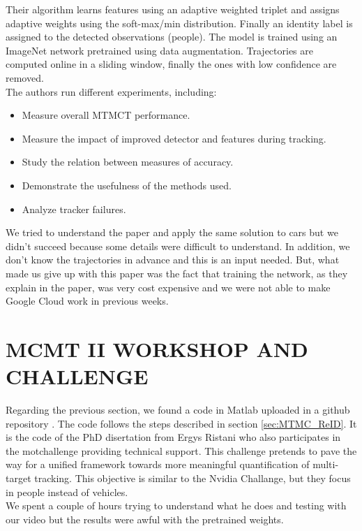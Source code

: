 \documentclass[journal, a4paper]{IEEEtran}
\begin{document}
Their algorithm  learns features using an adaptive weighted triplet and 
assigns adaptive weights using the soft-max/min distribution. Finally an identity label is assigned to the detected observations (people).
The model is trained using an ImageNet network pretrained using data augmentation. Trajectories are computed online in a sliding window,  finally the ones with low confidence are removed. \\

The authors run different experiments, including: 

\begin{itemize}
\item Measure overall MTMCT performance.
\item Measure the impact of improved detector and features during tracking.
\item Study the relation between measures of accuracy. 
\item Demonstrate the usefulness of the methods used.
\item Analyze tracker failures.
\end{itemize}

We tried to understand the paper and apply the same solution to cars but we didn't succeed because some details were difficult to understand. In addition, we don't know the trajectories in advance and this is an input needed. But, what made us give up with this paper was the fact that training the network, as they explain in the paper, was very cost expensive and we were not able to make Google Cloud \cite{GoogleCloud} work in previous weeks.  



\section{MCMT II WORKSHOP AND CHALLENGE}
\label{sec:MTMC_Workshop}
Regarding the previous section, we found a code in Matlab uploaded in a github repository \cite{DeepCC}. The code follows the steps described in section \ref{sec:MTMC_ReID}. 
It is the code of the PhD disertation from Ergys Ristani who also participates in the motchallenge \cite{Motchallenge} providing technical support. This challenge pretends to pave the way for a unified framework towards more meaningful quantification of multi-target tracking.  This objective is similar to the Nvidia Challange, but they focus in people instead of vehicles.\\
We spent a couple of hours trying to understand what he does and testing with our video but the results were awful with the pretrained weights.
\end{document}
